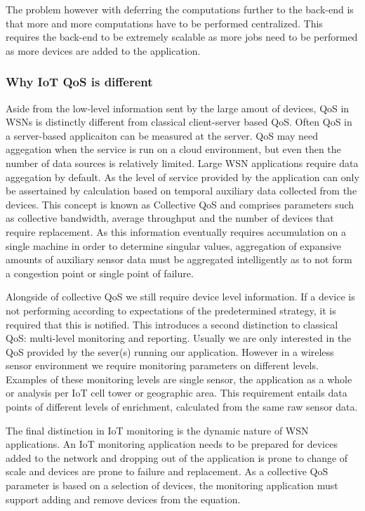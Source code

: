The problem however with deferring the computations further to the back-end is that more and more computations have to be performed centralized. This requires the back-end to be extremely scalable as more jobs need to be performed as more devices are added to the application.

\subsubsection{Why IoT QoS is different}
Aside from the low-level information sent by the large amout of devices, QoS in WSNs is distinctly different from classical client-server based QoS. Often QoS in a server-based applicaiton can be measured at the server. QoS may need aggegation when the service is run on a cloud environment, but even then the number of data sources is relatively limited. Large WSN applications require data aggegation by default. As the level of service provided by the application can only be assertained by calculation based on temporal auxiliary data collected from the devices. This concept is known as Collective QoS \cite{collective_qos} and comprises parameters such as collective bandwidth, average throughput and the number of devices that require replacement. As this information eventually requires accumulation on a single machine in order to determine singular values, aggregation of expansive amounts of auxiliary sensor data must be aggregated intelligently as to not form a congestion point or single point of failure.

Alongside of collective QoS we still require device level information. If a device is not performing according to expectations of the predetermined strategy, it is required that this is notified. This introduces a second distinction to classical QoS: multi-level monitoring and reporting. Usually we are only interested in the QoS provided by the sever(s) running our application. However in a wireless sensor environment we require monitoring parameters on different levels. Examples of these monitoring levels are single sensor, the application as a whole or analysis per IoT cell tower or geographic area. This requirement entails data points of different levels of enrichment, calculated from the same raw sensor data.

The final distinction in IoT monitoring is the dynamic nature of WSN applications. An IoT monitoring application needs to be prepared for devices added to the network and dropping out of the application is prone to change of scale and devices are prone to failure and replacement. As a collective QoS parameter is based on a selection of devices, the monitoring application must support adding and remove devices from the equation.

